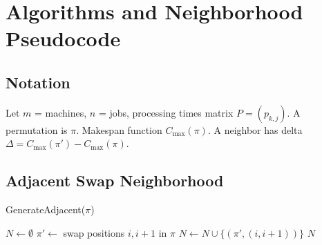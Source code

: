 
\section{Algorithms and Neighborhood Pseudocode}
\subsection{Notation}
Let $m$ = machines, $n$ = jobs, processing times matrix $P=(p_{k,j})$. A permutation is $\pi$. Makespan function $C_{\max}(\pi)$. A neighbor has delta $\Delta = C_{\max}(\pi')-C_{\max}(\pi)$.

\subsection{Adjacent Swap Neighborhood}
\begin{algorithm}[h]
  \caption{GenerateAdjacent($\pi$)}
  \begin{algorithmic}[1]
    \State $N \gets \emptyset$
      \State $\pi' \gets$ swap positions $i,i+1$ in $\pi$
      \State $N \gets N \cup \{(\pi', (i,i+1))\}$
    \EndFor
    \State \Return $N$
  \end{algorithmic}
\end{algorithm}

